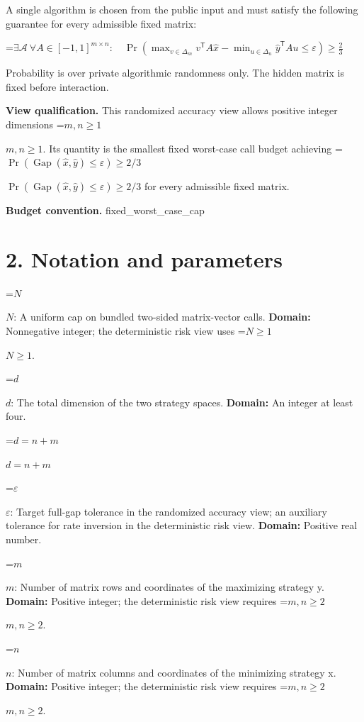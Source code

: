 \documentclass[10pt,a4paper]{article}
\newcommand{\AtlasMath}[1]{\par\begingroup\centering\setbox0=\hbox{$\displaystyle #1$}\ifdim\wd0>1.4\linewidth\typeout{ATLAS WIDE FORMULA: \the\wd0}\fi\ifdim\wd0>\linewidth\resizebox{\linewidth}{!}{\box0}\else\box0\fi\par\endgroup}
\newcommand{\AtlasInlineMath}[1]{\begingroup\setbox0=\hbox{$#1$}\ifdim\wd0>.4\linewidth\endgroup\AtlasMath{#1}\else\endgroup$#1$\fi}
\begin{document}
A single algorithm is chosen from the public input and must satisfy the following guarantee for every admissible fixed matrix:




\AtlasMath{\exists\mathcal A\ \forall A\in[-1,1]^{m\times n}:\quad\Pr\!\left(\max_{v\in\Delta_m}v^{\mathsf T}A\widehat x-\min_{u\in\Delta_n}\widehat y^{\mathsf T}Au\le\varepsilon\right)\ge\frac23}




Probability is over private algorithmic randomness only. The hidden matrix is fixed before interaction.



\textbf{View qualification.} This randomized accuracy view allows positive integer dimensions \AtlasInlineMath{m,n\ge1}. Its quantity is the smallest fixed worst-case call budget achieving \AtlasInlineMath{\Pr(\operatorname{Gap}(\widehat x,\widehat y)\le\varepsilon)\ge2/3} for every admissible fixed matrix.



\textbf{Budget convention.} fixed\_worst\_case\_cap



\section{2. Notation and parameters}


\AtlasInlineMath{N}: A uniform cap on bundled two-sided matrix-vector calls. \textbf{Domain:} Nonnegative integer; the deterministic risk view uses \AtlasInlineMath{N\ge1}.



\AtlasInlineMath{d}: The total dimension of the two strategy spaces. \textbf{Domain:} An integer at least four.



\AtlasInlineMath{d=n+m}



\AtlasInlineMath{\varepsilon}: Target full-gap tolerance in the randomized accuracy view; an auxiliary tolerance for rate inversion in the deterministic risk view. \textbf{Domain:} Positive real number.



\AtlasInlineMath{m}: Number of matrix rows and coordinates of the maximizing strategy y. \textbf{Domain:} Positive integer; the deterministic risk view requires \AtlasInlineMath{m,n\ge2}.



\AtlasInlineMath{n}: Number of matrix columns and coordinates of the minimizing strategy x. \textbf{Domain:} Positive integer; the deterministic risk view requires \AtlasInlineMath{m,n\ge2}.
\end{document}
